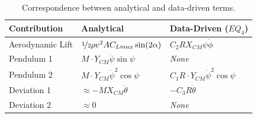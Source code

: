 \documentclass[fleqn,10pt]{wlscirep}
\begin{document}
\begin{table}[ht]
\centering
\begin{tabular}{|l|l|l|}
\hline
{\bf Contribution} & {\bf Analytical} & {\bf Data-Driven ($EQ_4$)}\\
\hline
Aerodynamic Lift & \(\nicefrac{1}{2}\rho v^2AC_{Lmax}\sin(2\alpha)\) & \(C_2RX_{CM}\psi\dot{\phi}\)\\
Pendulum 1 & \(M\cdot Y_{CM}\ddot{\psi}\sin{\psi}\) & \it{None} \\
Pendulum 2 & \(M\cdot Y_{CM}\dot{\psi}^2\cos{\psi}\) & \(C_1R\cdot Y_{CM}\dot{\psi}^2\cos{\psi}\) \\
Deviation 1 & \(\approx-MX_{CM}\ddot{\theta}\) & \(- C_3R\ddot{\theta}\)\\
Deviation 2 & \(\approx0\) & \it{None} \\
\hline
\end{tabular}
\caption{\label{table:eqcorrespondence}Correspondence between analytical and data-driven terms.}
\end{table}
\end{document}
